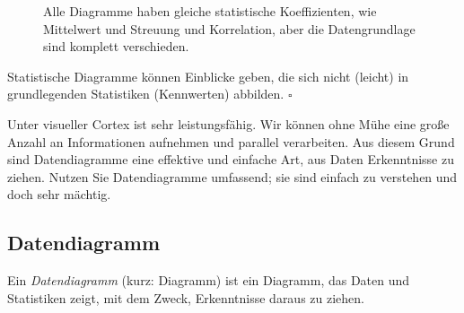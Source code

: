 \documentclass[
  letterpaper,
]{scrbook}
\theoremstyle{definition}
\theoremstyle{definition}
\theoremstyle{definition}
\theoremstyle{remark}
\begin{document}
\begin{figure}


\caption{\label{fig-dino1}Alle Diagramme haben gleiche statistische
Koeffizienten, wie Mittelwert und Streuung und Korrelation, aber die
Datengrundlage sind komplett verschieden.}

\end{figure}%

Statistische Diagramme können Einblicke geben, die sich nicht (leicht)
in grundlegenden Statistiken (Kennwerten) abbilden. \(\square\)

Unter visueller Cortex ist sehr leistungsfähig. Wir können ohne Mühe
eine große Anzahl an Informationen aufnehmen und parallel verarbeiten.
Aus diesem Grund sind Datendiagramme eine effektive und einfache Art,
aus Daten Erkenntnisse zu ziehen. Nutzen Sie Datendiagramme umfassend;
sie sind einfach zu verstehen und doch sehr mächtig.

\subsection{Datendiagramm}\label{datendiagramm}

Ein \emph{Datendiagramm} (kurz: Diagramm) ist ein Diagramm, das Daten
und Statistiken zeigt, mit dem Zweck, Erkenntnisse daraus zu ziehen.
\end{document}
